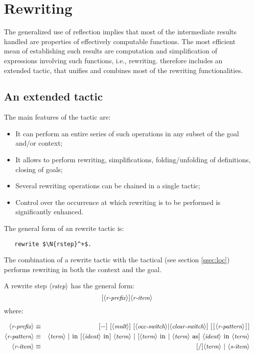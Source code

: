 \section{Rewriting}\label{sec:rw}
The generalized use of reflection implies that most of the
intermediate results handled are properties of effectively computable
functions. The most efficient mean of establishing such results are
computation and simplification of expressions involving such
functions, i.e., rewriting. \ssr{} therefore includes an extended
 tactic, that unifies and combines most of the rewriting
functionalities.
\subsection{An extended  tactic}\label{ssec:extrw}
The main features of the  tactic are:
\begin{itemize}
\item  It can perform an entire series of such operations in any
  subset of the goal and/or context;
\item It allows to perform rewriting,
  simplifications, folding/unfolding of definitions, closing of goals;
\item Several rewriting operations can be chained in a single tactic;
\item Control over the occurrence at which rewriting is to be performed is
  significantly enhanced.
\end{itemize}


The general form of an \ssr{} rewrite tactic is:
\begin{lstlisting}
   rewrite $\N{rstep}^+$.
\end{lstlisting}
The combination of a rewrite tactic with the  tactical (see
section \ref{ssec:loc}) performs rewriting in both the context and the
goal.

A rewrite step $\langle\mbox{\itshape\rmfamily\small rstep}\rangle$ has the general form:
$$[\langle\mbox{\itshape\rmfamily\small r-prefix}\rangle]\langle\mbox{\itshape\rmfamily\small r-item}\rangle$$
where:

\begin{eqnarray*}
\N{r-prefix} & \equiv &
[\C{-}]\ [\N{mult}]\ [\N{occ-switch} | \N{clear-switch}]\ [\C{[}\N{r-pattern}\C{]}]\\
\N{r-pattern} & \equiv &
   \N{term}\ |\ \C{in}\ [\N{ident}\ \C{in}]\ \N{term} \
   |\ [\N{term}\ \C{in}\ |\ \N{term}\ \C{as}]\ \N{ident}\ \C{in}\ \N{term}\\
\N{r-item} & \equiv &
 [\C{/}]\N{term} \ |\ \N{s-item} \\
\end{eqnarray*}


